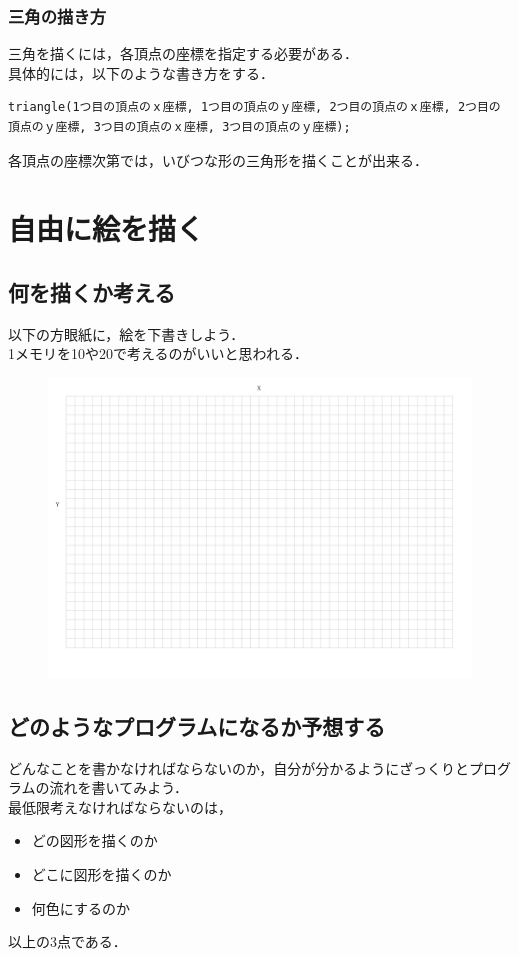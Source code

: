 \documentclass[a4j]{jarticle}
\begin{document}
\subsubsection{三角の描き方}
三角を描くには，各頂点の座標を指定する必要がある．\\
具体的には，以下のような書き方をする．
\begin{screen}
\begin{verbatim}
triangle(1つ目の頂点のｘ座標, 1つ目の頂点のｙ座標, 2つ目の頂点のｘ座標, 2つ目の頂点のｙ座標, 3つ目の頂点のｘ座標, 3つ目の頂点のｙ座標);
\end{verbatim}
\end{screen}
各頂点の座標次第では，いびつな形の三角形を描くことが出来る．
\newpage

\section{自由に絵を描く}
\subsection{何を描くか考える}
以下の方眼紙に，絵を下書きしよう．\\
1メモリを10や20で考えるのがいいと思われる．
\begin{figure}[h]
\includegraphics[width=17cm]{hougan.pdf}
\end{figure}
\subsection{どのようなプログラムになるか予想する}
どんなことを書かなければならないのか，自分が分かるようにざっくりとプログラムの流れを書いてみよう．	\\	
最低限考えなければならないのは，
\begin{itemize}
\item どの図形を描くのか
\item どこに図形を描くのか
\item 何色にするのか
\end{itemize}
以上の3点である．
\end{document}
